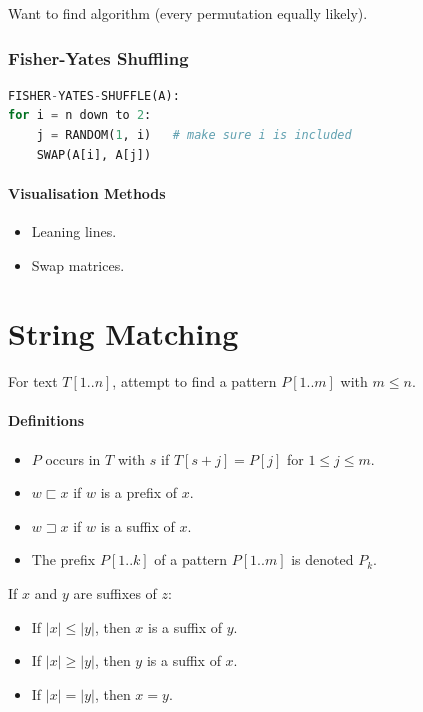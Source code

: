 \documentclass[twocolumn,english]{article}
\numberwithin{equation}{section}
\numberwithin{figure}{section}
\numberwithin{table}{section}
\let\emph\relax
\begin{document}
Want to find \emph{unbiased} algorithm (every permutation equally
likely).


\subsubsection*{Fisher-Yates Shuffling}

\begin{lstlisting}[language=Python,basicstyle={\footnotesize\ttfamily},tabsize=4,frame=single]
FISHER-YATES-SHUFFLE(A):
for i = n down to 2:
	j = RANDOM(1, i)   # make sure i is included
	SWAP(A[i], A[j])
\end{lstlisting}



\paragraph{Visualisation Methods}
\begin{itemize}
\item Leaning lines. 
\item Swap matrices. 
\end{itemize}

\section{String Matching}

For text $T\left[1..n\right]$, attempt to find a pattern $P\left[1..m\right]$
with $m\leq n$.


\paragraph{Definitions}
\begin{itemize}
\item $P$ occurs in $T$ with \emph{shift} $s$ if $T\left[s+j\right]=P\left[j\right]$
for $1\leq j\leq m$. 
\item $w\sqsubset x$ if $w$ is a prefix of $x$. 
\item $w\sqsupset x$ if $w$ is a suffix of $x$. 
\item The prefix $P\left[1..k\right]$ of a pattern $P\left[1..m\right]$
is denoted $P_{k}$. 
\end{itemize}
If $x$ and $y$ are suffixes of $z$: 
\begin{itemize}
\item If $\left|x\right|\leq\left|y\right|$, then $x$ is a suffix of $y$. 
\item If $\left|x\right|\geq\left|y\right|$, then $y$ is a suffix of $x$. 
\item If $\left|x\right|=\left|y\right|$, then $x=y$. 
\end{itemize}
\end{document}
